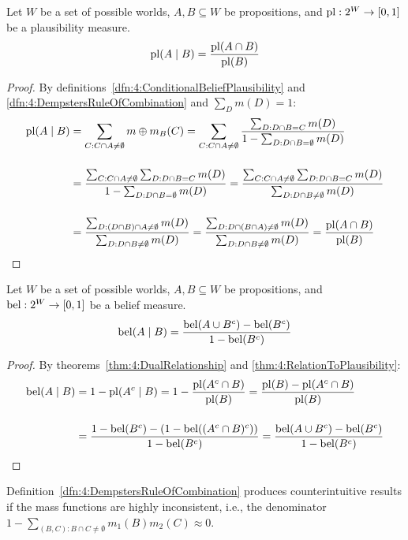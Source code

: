 \begin{thm}
  \label{thm:4:RelationToPlausibility}
  Let $W$ be a set of possible worlds, $A, B \subseteq W$ be propositions, and
  $\operatorname*{pl} : 2^W \to [0, 1]$ be a plausibility measure.
  \begin{equation}
    \label{eqn:4:RelationToPlausibility}
    \operatorname*{pl}(A \mid B) = \frac{\operatorname*{pl}(A \cap B)}{\operatorname*{pl}(B)}
  \end{equation}
  \begin{proof}
    By definitions~\ref{dfn:4:ConditionalBeliefPlausibility} and
    \ref{dfn:4:DempstersRuleOfCombination} and $\sum_D m(D) = 1$:
    \begin{align*}
      \operatorname*{pl}(A \mid B)
       & = \sum_{C : C \cap A \neq \emptyset} m \oplus m_B(C)
      = \sum_{C : C \cap A \neq \emptyset} \frac{\sum_{D : D \cap B = C} m(D)}{1 - \sum_{D : D \cap B = \emptyset} m(D)}
      \\[3ex]
       & = \frac{\sum_{C : C \cap A \neq \emptyset} \sum_{D : D \cap B = C} m(D)}{1 - \sum_{D : D \cap B = \emptyset} m(D)}
      =  \frac{\sum_{C : C \cap A \neq \emptyset} \sum_{D : D \cap B = C} m(D)}{\sum_{D : D \cap B \neq \emptyset} m(D)}
      \\[3ex]
       & = \frac{\sum_{D : (D \cap B) \cap A \neq \emptyset} m(D)}{\sum_{D : D \cap B \neq \emptyset} m(D)}
      = \frac{\sum_{D : D \cap (B \cap A) \neq \emptyset} m(D)}{\sum_{D : D \cap B \neq \emptyset} m(D)}
      = \frac{\operatorname*{pl}(A \cap B)}{\operatorname*{pl}(B)}
    \end{align*}
  \end{proof}
\end{thm}

\begin{thm}
  Let $W$ be a set of possible worlds, $A, B \subseteq W$ be propositions, and
  $\operatorname*{bel} : 2^W \to [0, 1]$ be a belief measure.
  \begin{equation}
    \label{eqn:4:RelationToBelief}
    \operatorname*{bel}(A \mid B) = \frac{\operatorname*{bel}(A \cup B^c) - \operatorname*{bel}(B^c)}{1 - \operatorname*{bel}(B^c)}
  \end{equation}
  \begin{proof}
    By theorems~\ref{thm:4:DualRelationship} and
    \ref{thm:4:RelationToPlausibility}:
    \begin{align*}
      \operatorname*{bel}(A \mid B)
       & = 1 - \operatorname*{pl}(A^c \mid B)
      = 1 - \frac{\operatorname*{pl}(A^c \cap B)}{\operatorname*{pl}(B)}
      = \frac{\operatorname*{pl}(B) - \operatorname*{pl}(A^c \cap B)}{\operatorname*{pl}(B)}
      \\[3ex]
       & = \frac{1 - \operatorname*{bel}(B^c) - (1 - \operatorname*{bel}((A^c \cap B)^c))}{1 - \operatorname*{bel}(B^c)}
      = \frac{\operatorname*{bel}(A \cup B^c) - \operatorname*{bel}(B^c)}{1 - \operatorname*{bel}(B^c)}
    \end{align*}
  \end{proof}
\end{thm}

Definition~\ref{dfn:4:DempstersRuleOfCombination} produces counterintuitive
results if the mass functions are highly inconsistent, i.e., the denominator $1
  - \sum_{(B, C) : B \cap C \neq \emptyset} m_1(B) m_2(C) \approx 0$.
